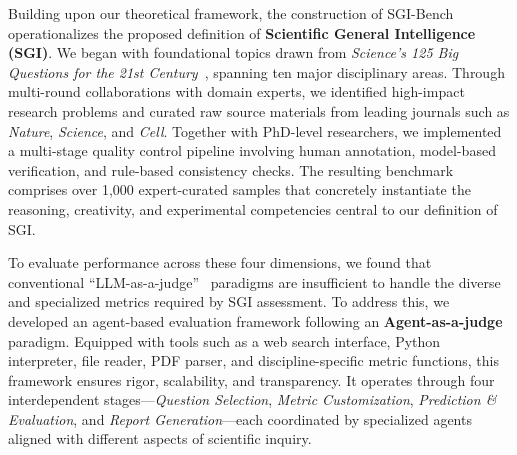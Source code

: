 Building upon our theoretical framework, the construction of SGI-Bench operationalizes the proposed definition of \textbf{Scientific General Intelligence (SGI)}. We began with foundational topics drawn from \textit{Science's 125 Big Questions for the 21st Century}~\cite{sanders2021125}, spanning ten major disciplinary areas. Through multi-round collaborations with domain experts, we identified high-impact research problems and curated raw source materials from leading journals such as \textit{Nature}, \textit{Science}, and \textit{Cell}. Together with PhD-level researchers, we implemented a multi-stage quality control pipeline involving human annotation, model-based verification, and rule-based consistency checks. The resulting benchmark comprises over 1,000 expert-curated samples that concretely instantiate the reasoning, creativity, and experimental competencies central to our definition of SGI.

To evaluate performance across these four dimensions, we found that conventional “LLM-as-a-judge”~\cite{li2025generation} paradigms are insufficient to handle the diverse and specialized metrics required by SGI assessment. To address this, we developed an agent-based evaluation framework following an \textbf{Agent-as-a-judge}~\cite{zhuge2024agent} paradigm. Equipped with tools such as a web search interface, Python interpreter, file reader, PDF parser, and discipline-specific metric functions, this framework ensures rigor, scalability, and transparency. It operates through four interdependent stages—\textit{Question Selection}, \textit{Metric Customization}, \textit{Prediction \& Evaluation}, and \textit{Report Generation}—each coordinated by specialized agents aligned with different aspects of scientific inquiry.


